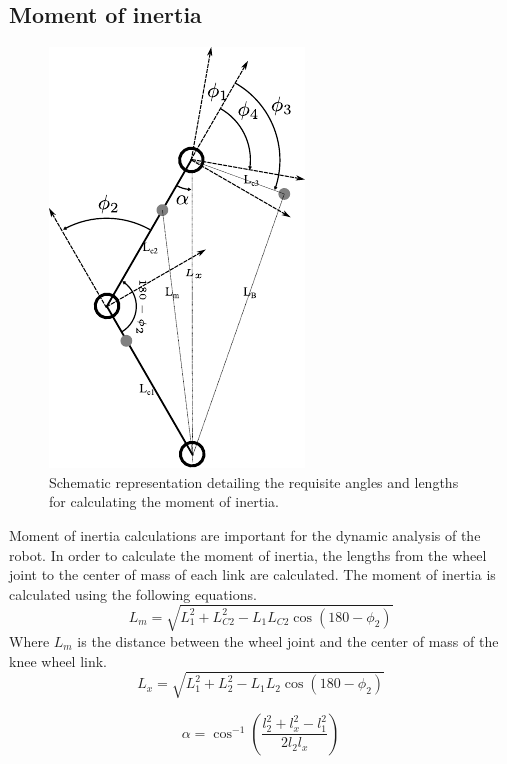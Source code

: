 \subsection{Moment of inertia}
	\begin{figure}[h]
		\centering
		\includegraphics[width=.5\textwidth]{Angles}
		\caption[Moment of inertia Schematic representation]{Schematic representation detailing the requisite angles and lengths for calculating the moment of inertia.}
		\label{fig:Schematic representation xxxxx detailing the requisite angles and lengths for calculating the moment of inertia.}
	\end{figure}


	Moment of inertia calculations are important for the dynamic analysis of the robot. In order to calculate the moment of inertia, the lengths from the wheel joint to the center of mass of each link are calculated. The moment of inertia is calculated using the following equations.
	\begin{equation}
		L_m = \sqrt{L_1^2 + L_{C2}^2 - L_1 L_{C2} \cos(180 - \phi_2)}
	\end{equation}
Where $L_m$ is the distance between the wheel joint and the center of mass of the knee wheel link.
	\begin{equation}
		L_{x} = \sqrt{L_1^2 + L_2^2 - L_1 L_2 \cos(180 - \phi_2)}
	\end{equation}


	\begin{equation}
		\alpha = \cos^{-1} \left( \frac{l_2^2 + l_{x}^2 - l_1^2}{2 l_2 l_{x}} \right)
	\end{equation}

